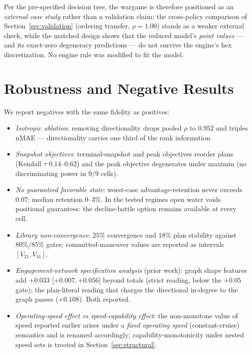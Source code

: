\documentclass[12pt,a4paper]{article}
\begin{document}
Per the pre-specified decision tree, the wargame is therefore positioned
as an \emph{external case study} rather than a validation claim: the cross-policy
comparison of Section~\ref{sec:validation} (ordering transfer,
$\rho=1.00$) stands as a weaker external check, while the matched design
shows that the reduced model's \emph{point values} --- and its
exact-zero degeneracy predictions --- do not survive the engine's hex
discretization.  No engine rule was modified to fit the model.

\section{Robustness and Negative Results}\label{sec:negative}

We report negatives with the same fidelity as positives:
\begin{itemize}
\item \emph{Isotropic ablation}: removing directionality drops
pooled $\rho$ to $0.952$ and triples nMAE --- directionality carries one
third of the rank information.
\item \emph{Snapshot objectives}: terminal-snapshot and peak
objectives reorder plans (Kendall $\tau$ $0.14$--$0.62$) and the peak
objective degenerates under maximin (no discriminating power in $9/9$
cells).
\item \emph{No guaranteed favorable state}: worst-case
advantage-retention never exceeds $0.07$; median retention $0$--$3\%$.
In the tested regimes open water voids positional guarantees: the
decline-battle option remains available at every cell.
\item \emph{Library non-convergence}: $25\%$ convergence and $18\%$
plan stability against $80\%$/$85\%$ gates; committed-maneuver values are
reported as intervals $[V_{21},V_{41}]$.
\item \emph{Engagement-network specification analysis} (prior work): graph
shape features add $+0.033$ [$+0.007,+0.056$] beyond totals (strict
reading, below the $+0.05$ gate); the plan-literal reading that charges
the directional in-degree to the graph passes ($+0.108$).  Both reported.
\item \emph{Operating-speed effect vs speed-capability effect}: the
non-monotone value of speed reported earlier arises under a
\emph{fixed operating speed} (constant-cruise) semantics and is renamed
accordingly; capability-monotonicity under nested speed sets is treated
in Section~\ref{sec:structural}.
\end{itemize}
\end{document}
